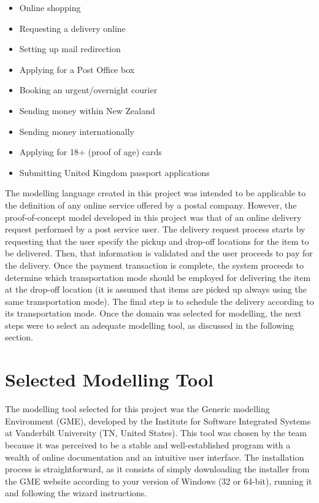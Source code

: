 \documentclass[11pt, a4paper, oneside, openright]{article}
\begin{document}
\begin{itemize}
  \item Online shopping
  \item Requesting a delivery online
  \item Setting up mail redirection
  \item Applying for a Post Office box
  \item Booking an urgent/overnight courier
  \item Sending money within New Zealand
  \item Sending money internationally
  \item Applying for 18+ (proof of age) cards
  \item Submitting United Kingdom passport applications
\end{itemize}

The modelling language created in this project was intended to be applicable to
the definition of any online service offered by a postal company. However, the
proof-of-concept model developed in this project was that of an online delivery
request performed by a post service user. The delivery request process starts by
requesting that the user specify the pickup and drop-off locations for the item
to be delivered. Then, that information is validated and the user proceeds to
pay for the delivery. Once the payment transaction is complete, the system
proceeds to determine which transportation mode should be employed for
delivering the item at the drop-off location (it is assumed that items are
picked up always using the same transportation mode). The final step is to
schedule the delivery according to its transportation mode. Once the domain was
selected for modelling, the next steps were to select an adequate modelling
tool, as discussed in the following section.

\section{Selected Modelling Tool}

The modelling tool selected for this project was the Generic modelling Environment
(GME), developed by the Institute for Software Integrated Systems at Vanderbilt
University (TN, United States). This tool was chosen by the team because it was
perceived to be a stable and well-established program with a wealth of online
documentation and an intuitive user interface. The installation process is
straightforward, as it consists of simply downloading the installer from the GME
website \cite{gmeSite} according to your version of Windows (32 or 64-bit), running it and
following the wizard instructions.
\end{document}
